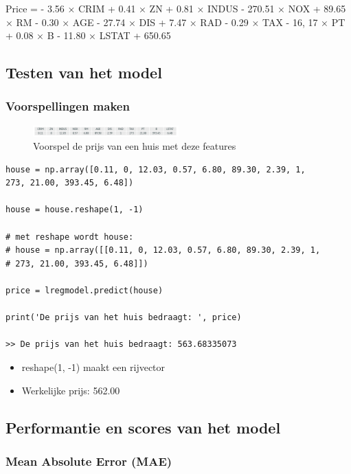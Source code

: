 \documentclass{article}
\begin{document}
Price = - 3.56 × CRIM + 0.41 × ZN + 0.81 × INDUS - 270.51 × NOX + 89.65 × RM
- 0.30 × AGE - 27.74 × DIS + 7.47 × RAD - 0.29 × TAX - 16, 17 × PT
+ 0.08 × B - 11.80 × LSTAT + 650.65


\subsection{Testen van het model}

\subsubsection{Voorspellingen maken}

\begin{figure}[H]
    \centering
    \includegraphics[width=0.5\textwidth]{multiple-regression-voorspelling.png}
    \caption{Voorspel de prijs van een huis met deze features}
\end{figure}

\begin{verbatim}
house = np.array([0.11, 0, 12.03, 0.57, 6.80, 89.30, 2.39, 1, 
273, 21.00, 393.45, 6.48])

house = house.reshape(1, -1)

# met reshape wordt house:
# house = np.array([[0.11, 0, 12.03, 0.57, 6.80, 89.30, 2.39, 1, 
# 273, 21.00, 393.45, 6.48]])

price = lregmodel.predict(house)

print('De prijs van het huis bedraagt: ', price)

>> De prijs van het huis bedraagt: 563.68335073
\end{verbatim}

\begin{itemize}
    \item reshape(1, -1) maakt een rijvector
    \item Werkelijke prijs: 562.00
\end{itemize}

\subsection{Performantie en scores van het model}

\subsubsection{Mean Absolute Error (MAE)}
\end{document}
